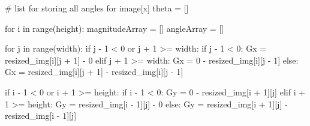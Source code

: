 \documentclass[
  letterpaper,
  DIV=11,
  numbers=noendperiod]{scrreprt}
\newenvironment{Shaded}{\begin{snugshade}}{\end{snugshade}}
\newcommand{\BuiltInTok}[1]{\textcolor[rgb]{0.00,0.23,0.31}{#1}}
\newcommand{\CommentTok}[1]{\textcolor[rgb]{0.37,0.37,0.37}{#1}}
\newcommand{\ControlFlowTok}[1]{\textcolor[rgb]{0.00,0.23,0.31}{#1}}
\newcommand{\DecValTok}[1]{\textcolor[rgb]{0.68,0.00,0.00}{#1}}
\newcommand{\KeywordTok}[1]{\textcolor[rgb]{0.00,0.23,0.31}{#1}}
\newcommand{\NormalTok}[1]{\textcolor[rgb]{0.00,0.23,0.31}{#1}}
\newcommand{\OperatorTok}[1]{\textcolor[rgb]{0.37,0.37,0.37}{#1}}
\begin{document}
\begin{Shaded}
\begin{Highlighting}[]
    \CommentTok{\# list for storing all angles for image[x]}
\NormalTok{    theta }\OperatorTok{=}\NormalTok{ []}
    
    \ControlFlowTok{for}\NormalTok{ i }\KeywordTok{in} \BuiltInTok{range}\NormalTok{(height):}
\NormalTok{        magnitudeArray }\OperatorTok{=}\NormalTok{ []}
\NormalTok{        angleArray }\OperatorTok{=}\NormalTok{ []}

        \ControlFlowTok{for}\NormalTok{ j }\KeywordTok{in} \BuiltInTok{range}\NormalTok{(width):}
            \ControlFlowTok{if}\NormalTok{ j }\OperatorTok{{-}} \DecValTok{1} \OperatorTok{\textless{}} \DecValTok{0} \KeywordTok{or}\NormalTok{ j }\OperatorTok{+} \DecValTok{1} \OperatorTok{\textgreater{}=}\NormalTok{ width:}
                \ControlFlowTok{if}\NormalTok{ j }\OperatorTok{{-}} \DecValTok{1} \OperatorTok{\textless{}} \DecValTok{0}\NormalTok{:}
\NormalTok{                    Gx }\OperatorTok{=}\NormalTok{ resized\_img[i][j }\OperatorTok{+} \DecValTok{1}\NormalTok{] }\OperatorTok{{-}} \DecValTok{0}
                \ControlFlowTok{elif}\NormalTok{ j }\OperatorTok{+} \DecValTok{1} \OperatorTok{\textgreater{}=}\NormalTok{ width:}
\NormalTok{                    Gx }\OperatorTok{=} \DecValTok{0} \OperatorTok{{-}}\NormalTok{ resized\_img[i][j }\OperatorTok{{-}} \DecValTok{1}\NormalTok{]}
            \ControlFlowTok{else}\NormalTok{:}
\NormalTok{                Gx }\OperatorTok{=}\NormalTok{ resized\_img[i][j }\OperatorTok{+} \DecValTok{1}\NormalTok{] }\OperatorTok{{-}}\NormalTok{ resized\_img[i][j }\OperatorTok{{-}} \DecValTok{1}\NormalTok{]}

            \ControlFlowTok{if}\NormalTok{ i }\OperatorTok{{-}} \DecValTok{1} \OperatorTok{\textless{}} \DecValTok{0} \KeywordTok{or}\NormalTok{ i }\OperatorTok{+} \DecValTok{1} \OperatorTok{\textgreater{}=}\NormalTok{ height:}
                \ControlFlowTok{if}\NormalTok{ i }\OperatorTok{{-}} \DecValTok{1} \OperatorTok{\textless{}} \DecValTok{0}\NormalTok{:}
\NormalTok{                    Gy }\OperatorTok{=} \DecValTok{0} \OperatorTok{{-}}\NormalTok{ resized\_img[i }\OperatorTok{+} \DecValTok{1}\NormalTok{][j]}
                \ControlFlowTok{elif}\NormalTok{ i }\OperatorTok{+} \DecValTok{1} \OperatorTok{\textgreater{}=}\NormalTok{ height:}
\NormalTok{                    Gy }\OperatorTok{=}\NormalTok{ resized\_img[i }\OperatorTok{{-}} \DecValTok{1}\NormalTok{][j] }\OperatorTok{{-}} \DecValTok{0}
            \ControlFlowTok{else}\NormalTok{:}
\NormalTok{                Gy }\OperatorTok{=}\NormalTok{ resized\_img[i }\OperatorTok{+} \DecValTok{1}\NormalTok{][j] }\OperatorTok{{-}}\NormalTok{ resized\_img[i }\OperatorTok{{-}} \DecValTok{1}\NormalTok{][j]}


\end{Highlighting}
\end{Shaded}
\end{document}
